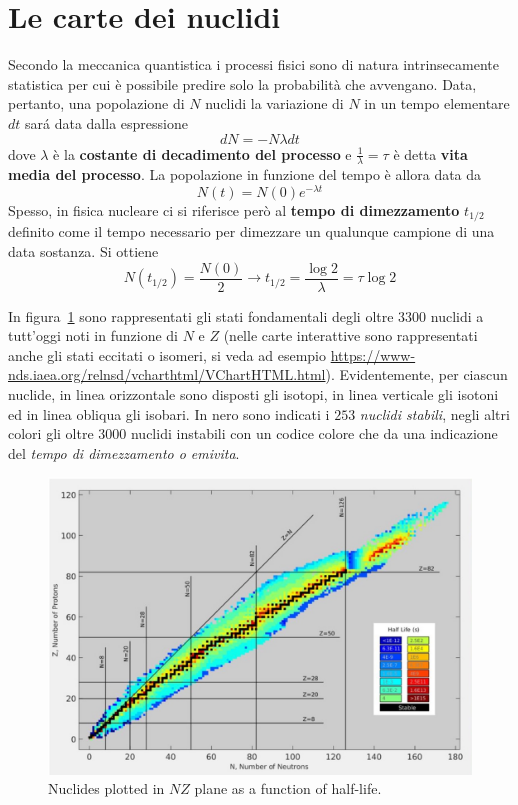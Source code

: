 \section{Le carte dei nuclidi}\label{sec:le-carte-dei-nuclidi}
\begin{marginfigure}
    Secondo la meccanica quantistica i processi fisici sono di natura intrinsecamente statistica per cui è possibile predire
    solo la probabilità che avvengano.
    Data, pertanto, una popolazione di $ N $ nuclidi la variazione di $ N $ in un tempo elementare $ dt $ sará data dalla
    espressione
    \[
        dN = - N \lambda dt
    \]
    dove $ \lambda $ è la \textbf{costante di decadimento del processo} e $ \frac{1}{\lambda} = \tau $ è detta \textbf{vita
    media del processo}.
    La popolazione in funzione del tempo è allora data da
    \[
        N(t) = N(0) e^{- \lambda t}
    \]
    Spesso, in fisica nucleare ci si riferisce però al \textbf{tempo di dimezzamento} $ t_{1/2} $ definito come il tempo
    necessario per dimezzare un qualunque campione di una data sostanza. Si ottiene
    \[
        N(t_{1/2}) = \frac{N(0)}{2} \to t_{1/2} = \frac{\log 2}{\lambda} = \tau \log 2
    \]
\end{marginfigure}
In figura~\ref{fig:nuclides-chart-emilife} sono rappresentati gli stati fondamentali degli oltre 3300 nuclidi a tutt’oggi
noti in funzione di $ N $ e $ Z $ (nelle carte interattive sono rappresentati anche gli stati eccitati o isomeri,
si veda ad esempio \url{https://www-nds.iaea.org/relnsd/vcharthtml/VChartHTML.html}).
Evidentemente, per ciascun nuclide, in linea orizzontale sono disposti gli isotopi, in linea verticale gli isotoni ed
in linea obliqua gli isobari.
In nero sono indicati i $253$ \emph{nuclidi stabili}, negli altri colori gli oltre $3000$ nuclidi instabili con un
codice colore che da una indicazione del \emph{tempo di dimezzamento o emivita}.
\begin{figure}
    \centering
    \includegraphics{../figs/nuclides-chart-emilife}
    \caption{Nuclides plotted in $ NZ $ plane as a function of half-life.}
    \label{fig:nuclides-chart-emilife}
\end{figure}
